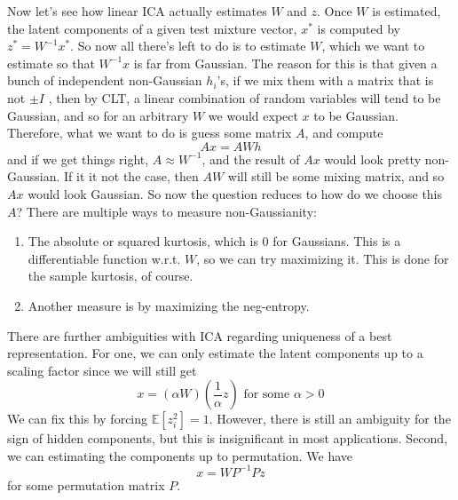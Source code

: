 \documentclass{article}
\begin{document}
  \begin{algo}[Fitting]
    Now let's see how linear ICA actually estimates $W$ and $z$. Once $W$ is estimated, the latent components of a given test mixture vector, $x^\ast$ is computed by $z^\ast = W^{-1} x^\ast$. So now all there's left to do is to estimate $W$, which we want to estimate so that $W^{-1} x$ is far from Gaussian. The reason for this is that given a bunch of independent non-Gaussian $h_i$'s, if we mix them with a matrix that is not $\pm I$ , then by CLT, a linear combination of random variables will tend to be Gaussian, and so for an arbitrary $W$ we would expect $x$ to be Gaussian. Therefore, what we want to do is guess some matrix $A$, and compute 
    \begin{equation}
      A x = A W h
    \end{equation}
    and if we get things right, $A \approx W^{-1}$, and the result of $A x$ would look pretty non-Gaussian. If it it not the case, then $A W$ will still be some mixing matrix, and so $A x$ would look Gaussian. So now the question reduces to how do we choose this $A$? There are multiple ways to measure non-Gaussianity: 
    \begin{enumerate} 
      \item The absolute or squared kurtosis, which is $0$ for Gaussians. This is a differentiable function w.r.t. $W$, so we can try maximizing it. This is done for the sample kurtosis, of course.  
      \item Another measure is by maximizing the neg-entropy. 
    \end{enumerate}
  \end{algo}

  There are further ambiguities with ICA regarding uniqueness of a best representation. For one, we can only estimate the latent components up to a scaling factor since we will still get
  \begin{equation}
    x = (\alpha W) (\frac{1}{\alpha} z) \text{ for some } \alpha > 0
  \end{equation}
  We can fix this by forcing $\mathbb{E}[z_i^2] = 1$. However, there is still an ambiguity for the sign of hidden components, but this is insignificant in most applications. Second, we can estimating the components up to permutation. We have 
  \begin{equation}
    x = W P^{-1} P z
  \end{equation}
  for some permutation matrix $P$. 
\end{document}

